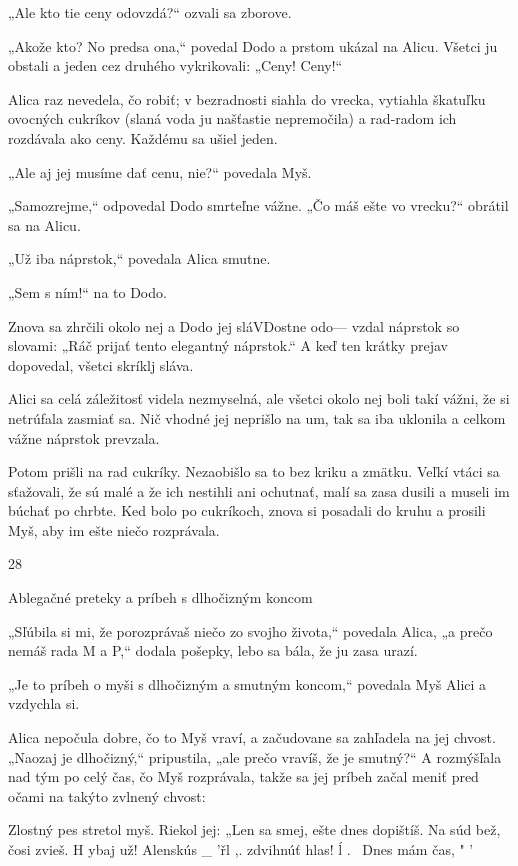 \documentclass[12pt]{article}
\begin{document}
\begin{Parallel}[p]{}{}
{{„Ale kto tie ceny odovzdá?“ ozvali sa zborove.

„Akože kto? No predsa ona,“ povedal Dodo a prstom
ukázal na Alicu. Všetci ju obstali a jeden cez druhého
vykrikovali: „Ceny! Ceny!“

Alica raz nevedela, čo robiť; v bezradnosti siahla do
vrecka, vytiahla škatuľku ovocných cukríkov (slaná voda ju
našťastie nepremočila) a rad-radom ich rozdávala ako ceny.
Každému sa ušiel jeden.

„Ale aj jej musíme dať cenu, nie?“ povedala Myš.

„Samozrejme,“ odpovedal Dodo smrteľne vážne. „Čo
máš ešte vo vrecku?“ obrátil sa na Alicu.

„Už iba náprstok,“ povedala Alica smutne.

„Sem s ním!“ na to Dodo.

Znova sa zhrčili okolo nej a Dodo jej sláVDostne odo—
vzdal náprstok so slovami: „Ráč prijať tento elegantný
náprstok.“ A keď ten krátky prejav dopovedal, všetci
skríklj sláva.

Alici sa celá záležitosť videla nezmyselná, ale všetci okolo
nej boli takí vážni, že si netrúfala zasmiať sa. Nič vhodné jej
neprišlo na um, tak sa iba uklonila a celkom vážne náprstok
prevzala.

Potom prišli na rad cukríky. Nezaobišlo sa to bez kriku
a zmätku. Veľkí vtáci sa sťažovali, že sú malé a že ich nestihli
ani ochutnať, malí sa zasa dusili a museli im búchať po
chrbte. Ked bolo po cukríkoch, znova si posadali do kruhu
a prosili Myš, aby im ešte niečo rozprávala.

28

Ablegačné preteky a príbeh s dlhočizným koncom

„Sľúbila si mi, že porozprávaš niečo zo svojho života,“
povedala Alica, „a prečo nemáš rada M a P,“ dodala
pošepky, lebo sa bála, že ju zasa urazí.

„Je to príbeh o myši s dlhočizným a smutným koncom,“
povedala Myš Alici a vzdychla si.

Alica nepočula dobre, čo to Myš vraví, a začudovane sa
zahľadela na jej chvost. „Naozaj je dlhočizný,“ pripustila,
„ale prečo vravíš, že je smutný?“ A rozmýšľala nad tým po
celý čas, čo Myš rozprávala, takže sa jej príbeh začal meniť
pred očami na takýto zvlnený chvost:

 

Zlostný pes
stretol myš.
Riekol jej:
„Len sa smej,
ešte dnes
dopištíš.
Na súd bež,
čosi zvieš.
H ybaj už!
Alenskús _ 'řl ,.
zdvihnúť hlas! ĺ . \
Dnes mám čas, " '

}}
\end{Parallel}
\end{document}

